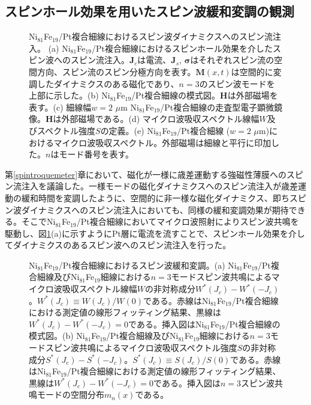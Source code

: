 \subsection{スピンホール効果を用いたスピン波緩和変調の観測}

\begin{figure}[bp]
 \begin{center}
 \end{center}
 \caption{Ni$_{81}$Fe$_{19}$/Pt複合細線におけるスピン波ダイナミクスへのスピン流注入。
(a) Ni$_{81}$Fe$_{19}$/Pt複合細線におけるスピンホール効果を介したスピン波へのスピン流注入。$\bm{J}_c$は電流、$\bm{J}_s$, $\bm{\sigma}$はそれぞれスピン流の空間方向、スピン流のスピン分極方向を表す。$\bm{M}(x,t)$は空間的に変調したダイナミクスのある磁化であり、$n=3$のスピン波モードを上部に示した。(b) Ni$_{81}$Fe$_{19}$/Pt複合細線の模式図。$\bm{H}$は外部磁場を表す。(c) 細線幅$w=2$ $\mu$m Ni$_{81}$Fe$_{19}$/Pt複合細線の走査型電子顕微鏡像。$\bm{H}$は外部磁場である。(d) マイクロ波吸収スペクトル線幅$W$及びスペクトル強度$S$の定義。(e) Ni$_{81}$Fe$_{19}$/Pt複合細線 ($w=2$ $\mu$m)におけるマイクロ波吸収スペクトル。外部磁場は細線と平行に印加した。$n$はモード番号を表す。}
 \label{spinwave_injection_sample}
\end{figure}

第\ref{spintroquemeter}章において、磁化が一様に歳差運動する強磁性薄膜へのスピン流注入を議論した。一様モードの磁化ダイナミクスへのスピン流注入が歳差運動の緩和時間を変調したように、空間的に非一様な磁化ダイナミクス、即ちスピン波ダイナミクスへのスピン流注入においても、同様の緩和変調効果が期待できる。そこでNi$_{81}$Fe$_{19}$/Pt複合細線においてマイクロ波照射によりスピン波共鳴を駆動し、図\ref{spinwave_injection_sample}(a)に示すようにPt層に電流を流すことで、スピンホール効果を介してダイナミクスのあるスピン波へのスピン流注入を行った。


\begin{figure}[tbp]
 \begin{center}
 \end{center}
 \caption{Ni$_{81}$Fe$_{19}$/Pt複合細線におけるスピン波緩和変調。(a) Ni$_{81}$Fe$_{19}$/Pt複合細線及びNi$_{81}$Fe$_{19}$細線における$n=3$モードスピン波共鳴によるマイクロ波吸収スペクトル線幅$W$の非対称成分$W^*(J_c)-W^*(-J_c)$。$W^*(J_c)\equiv W(J_c)/W(0)$である。赤線はNi$_{81}$Fe$_{19}$/Pt複合細線における測定値の線形フィッティング結果、黒線は$W^*(J_c)-W^*(-J_c)=0$である。挿入図はNi$_{81}$Fe$_{19}$/Pt複合細線の模式図。(b) Ni$_{81}$Fe$_{19}$/Pt複合細線及びNi$_{81}$Fe$_{19}$細線における$n=3$モードスピン波共鳴によるマイクロ波吸収スペクトル強度$S$の非対称成分$S^*(J_c)-S^*(-J_c)$。$S^*(J_c)\equiv S(J_c)/S(0)$である。赤線はNi$_{81}$Fe$_{19}$/Pt複合細線における測定値の線形フィッティング結果、黒線は$W^*(J_c)-W^*(-J_c)=0$である。挿入図は$n=3$スピン波共鳴モードの空間分布$m_n(x)$である。}
 \label{spinwave_relax_n3}
\end{figure}


